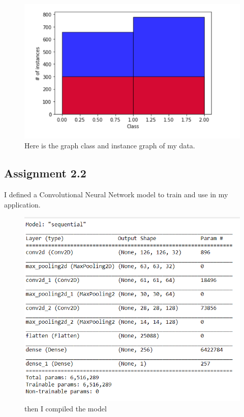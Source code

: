 \documentclass[onecolumn]{article}
\begin{document}
\begin{figure}[H]
\centering
    \includegraphics[width=1\linewidth]{graph.png}
\caption{ Here is the graph class and instance graph of my data.}
\end{figure}


\subsection{Assignment 2.2}

I defined a Convolutional Neural Network model to train and use in my application.


\begin{figure}[H]
\centering
    \includegraphics[width=1\linewidth]{assg2.png}
\caption{then I compiled the model}
\end{figure}
\end{document}
